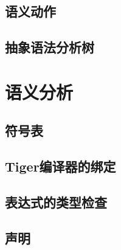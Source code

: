 \documentclass[cn,11pt,chinese]{elegantbook}
\begin{document}
\section{语义动作}

\section{抽象语法分析树}

\chapter{语义分析}

\section{符号表}

\section{Tiger编译器的绑定}

\section{表达式的类型检查}

\section{声明}
\end{document}
